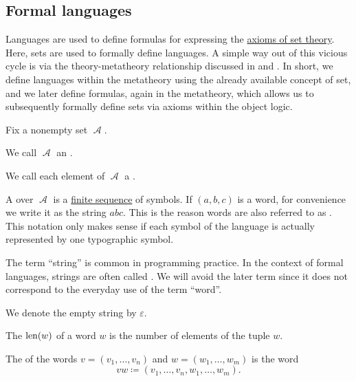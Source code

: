 \subsection{Formal languages}\label{subsec:formal_languages}

Languages are used to define formulas for expressing the \hyperref[def:zfc]{axioms of set theory}. Here, sets are used to formally define languages. A simple way out of this vicious cycle is via the theory-metatheory relationship discussed in  and . In short, we define languages within the metatheory using the already available concept of set, and we later define formulas, again in the metatheory, which allows us to subsequently formally define sets via axioms within the object logic.

\begin{definition}\label{def:formal_language}
  Fix a nonempty set \( \mscrA \).

  \begin{thmenum}
     We call \( \mscrA \) an .

     We call each element of \( \mscrA \) a .

     A  over \( \mscrA \) is a \hyperref[def:sequence]{finite sequence} of symbols. If \( (a, b, c) \) is a word, for convenience we write it as the string \( abc \). This is the reason words are also referred to as . This notation only makes sense if each symbol of the language is actually represented by one typographic symbol.

    The term \enquote{string} is common in programming practice. In the context of formal languages, strings are often called . We will avoid the later term since it does not correspond to the everyday use of the term \enquote{word}.

     We denote the empty string by \( \varepsilon \).

     The  \( \operatorname{len}(w) \) of a word \( w \) is the number of elements of the tuple \( w \).

     The  of the words \( v = (v_1, \ldots, v_n) \) and \( w = (w_1, \ldots, w_m) \) is the word
    \begin{equation*}
      vw \coloneqq (v_1, \ldots, v_n, w_1, \ldots, w_m).
    \end{equation*}


\end{thmenum}
\end{definition}
